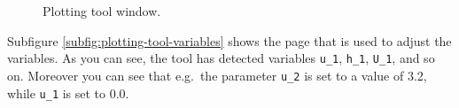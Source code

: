 \documentclass{article}
\begin{document}
\begin{figure}[ht]
  \centering
  \caption{Plotting tool window.}
  \label{fig:plotting-tool}
\end{figure}

Subfigure \ref{subfig:plotting-tool-variables} shows the page that is used to adjust the variables. As you can see, the tool has detected variables \texttt{u\_1}, \texttt{h\_1}, \texttt{U\_1}, and so on. Moreover you can see that e.g.\, the parameter \texttt{u\_2} is set to a value of 3.2, while \texttt{u\_1} is set to 0.0.
\end{document}
